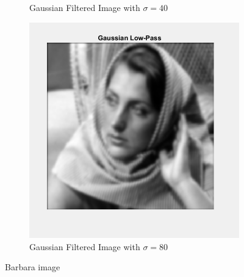\documentclass[a4paper]{article}
\begin{document}
\begin{figure}[h]
\begin{subfigure}{0.32\linewidth}
        \caption{Gaussian Filtered Image with $ \sigma=40$}
    \end{subfigure}
    \begin{subfigure}{0.32\linewidth}
        \centering
        \includegraphics[width=\linewidth]{80_image.png}
        \caption{Gaussian Filtered Image with $ \sigma=80$}
    \end{subfigure}
    \caption{Barbara image}
    \label{fig:bo}
\end{figure}
\end{document}
